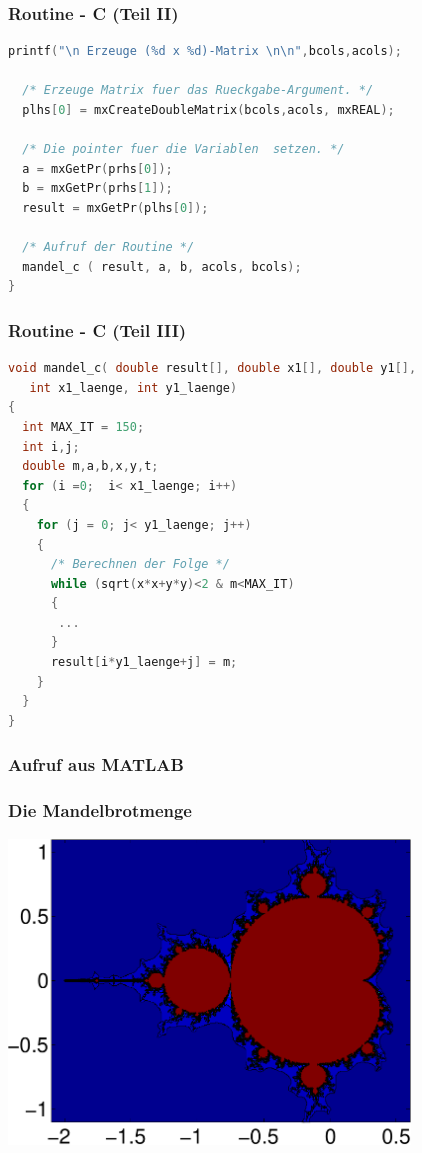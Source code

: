 \documentclass[hyperref={xetex}]{beamer}
\begin{document}
\begin{frame}[fragile]\frametitle{Routine - C (Teil II)}
\begin{lstlisting}[language=C++]  
  printf("\n Erzeuge (%d x %d)-Matrix \n\n",bcols,acols);
    
  /* Erzeuge Matrix fuer das Rueckgabe-Argument. */
  plhs[0] = mxCreateDoubleMatrix(bcols,acols, mxREAL);

  /* Die pointer fuer die Variablen  setzen. */
  a = mxGetPr(prhs[0]);
  b = mxGetPr(prhs[1]);
  result = mxGetPr(plhs[0]);

  /* Aufruf der Routine */
  mandel_c ( result, a, b, acols, bcols);
}
\end{lstlisting}
\end{frame}
\begin{frame}[fragile]\frametitle{Routine - C (Teil III)}
\begin{lstlisting}[language=C++]
void mandel_c( double result[], double x1[], double y1[], 
   int x1_laenge, int y1_laenge)
{
  int MAX_IT = 150;
  int i,j;
  double m,a,b,x,y,t;
  for (i =0;  i< x1_laenge; i++)
  {
    for (j = 0; j< y1_laenge; j++)
    {
      /* Berechnen der Folge */        
      while (sqrt(x*x+y*y)<2 & m<MAX_IT)
      {
       ...
      }
      result[i*y1_laenge+j] = m;
    }
  }
}
\end{lstlisting}
\end{frame}
\begin{frame}[fragile]\frametitle{Aufruf aus MATLAB}

\end{frame}
\begin{frame}[fragile]\frametitle{Die Mandelbrotmenge}
\begin{center}
\includegraphics[width=0.8\textwidth]{./figures/mandelbrot}
\end{center}
\end{frame}
%
%
\end{document}
